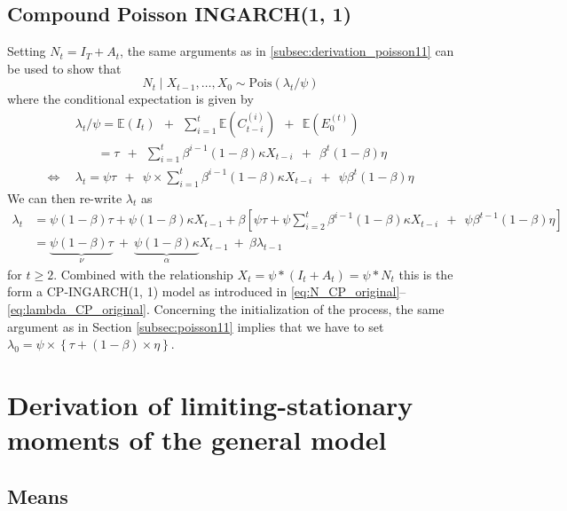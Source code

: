 \documentclass{article}
\begin{document}
\subsection{Compound Poisson INGARCH(1, 1)}

Setting $N_t = I_T + A_t$, the same arguments as in \eqref{subsec:derivation_poisson11} can be used to show that
$$
N_t \mid X_{t - 1}, \dots, X_0 \sim \text{Pois}(\lambda_t/\psi)
$$
where the conditional expectation is given by
\begin{align*}
& \lambda_t/\psi = \mathbb{E}(I_t) \ \ + \ \ \sum_{i = 1}^t \mathbb{E}(C_{t - i}^{(i)}) \ \ + \ \ \mathbb{E}(E_0^{(t)})\\
& \ \ \ \ \ \ \ \ = \tau \ \ + \ \ \sum_{i = 1}^t \beta^{i - 1}(1 - \beta)\kappa X_{t - i} \ \ + \ \ \beta^{t}(1 - \beta)\eta\\
\Leftrightarrow \ \ & \lambda_t = \psi \tau \ \ + \ \ \psi \times \sum_{i = 1}^t \beta^{i - 1}(1 - \beta)\kappa X_{t - i} \ \ + \ \ \psi\beta^{t}(1 - \beta)\eta
\end{align*}
We can then re-write $\lambda_t$ as
\begin{align*}
\lambda_t & = \psi(1 - \beta)\tau + \psi(1 - \beta)\kappa X_{t - 1} + \beta \left[\psi\tau +   \psi \sum_{i = 2}^t \beta^{i - 1}(1 - \beta)\kappa X_{t - i}  \ \ + \ \ \psi\beta^{t - 1}(1 - \beta)\eta\right]\\
& = \underbrace{\psi(1 - \beta)\tau}_{\nu} \ + \ \underbrace{\psi(1 - \beta)\kappa}_{\alpha} X_{t - 1} \ + \ \beta \lambda_{t - 1}
\end{align*}
for $t \geq 2$. Combined with the relationship $X_t = \psi * (I_t + A_t) = \psi * N_t$ this is the form a CP-INGARCH(1, 1) model as introduced in \eqref{eq:N_CP_original}--\eqref{eq:lambda_CP_original}. Concerning the initialization of the process, the same argument as in Section \ref{subsec:poisson11} implies that we have to set $\lambda_0 = \psi\times \left\{\tau + (1 - \beta) \times \eta\right\}$.


\section{Derivation of limiting-stationary moments of the general model}

\subsection{Means}
\end{document}
